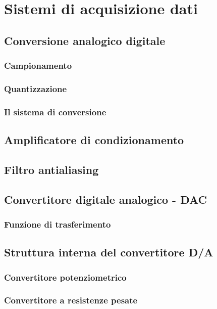 \documentclass[../main.tex]{subfiles}
\begin{document}
\section{Sistemi di acquisizione dati}

\subsection{Conversione analogico digitale}
\subsubsection{Campionamento}
\subsubsection{Quantizzazione}
\subsubsection{Il sistema di conversione}

\subsection{Amplificatore di condizionamento}

\subsection{Filtro antialiasing}

\subsection{Convertitore digitale analogico - DAC}
\subsubsection{Funzione di trasferimento}

\subsection{Struttura interna del convertitore D/A}
\subsubsection{Convertitore potenziometrico}
\subsubsection{Convertitore a resistenze pesate}
\end{document}
